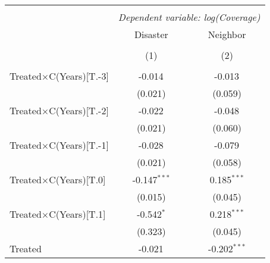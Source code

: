 
\begin{tabular}{@{\extracolsep{5pt}}lcc}
    \\[-1.8ex]\hline
    \hline                                                                                                           \\[-1.8ex]
                           & \multicolumn{2}{c}{\textit{Dependent variable: log(Coverage)}} \
    \cr \cline{2-3}
    \\[-1.8ex] & \multicolumn{1}{c}{Disaster} & \multicolumn{1}{c}{Neighbor}  \\
    \\[-1.8ex] & (1) & (2) \\
    \hline                                                                                                           \\[-1.8ex]
    Treated$\times$C(Years)[T.-3] & -0.014$^{}$                                                          & -0.013$^{}$      \\
                           & (0.021)                                                              & (0.059)          \\
    Treated$\times$C(Years)[T.-2] & -0.022$^{}$                                                          & -0.048$^{}$      \\
                           & (0.021)                                                              & (0.060)          \\
    Treated$\times$C(Years)[T.-1] & -0.028$^{}$                                                          & -0.079$^{}$      \\
                           & (0.021)                                                              & (0.058)          \\
    Treated$\times$C(Years)[T.0]  & -0.147$^{***}$                                                       & 0.185$^{***}$    \\
                           & (0.015)                                                              & (0.045)          \\
    Treated$\times$C(Years)[T.1]  & -0.542$^{*}$                                                         & 0.218$^{***}$    \\
                           & (0.323)                                                              & (0.045)          \\
    Treated                & -0.021$^{}$                                                          & -0.202$^{***}$   \\

\end{tabular}
